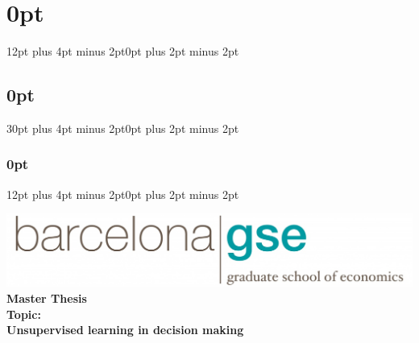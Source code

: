 \documentclass[12pt,a4paper,bibliography=totocnumbered,listof=totocnumbered]{scrartcl}
\begin{document}
\titlespacing\section{0pt}{12pt plus 4pt minus 2pt}{0pt plus 2pt minus 2pt}
\titlespacing\subsection{0pt}{30pt plus 4pt minus 2pt}{0pt plus 2pt minus 2pt}
\titlespacing\subsubsection{0pt}{12pt plus 4pt minus 2pt}{0pt plus 2pt minus 2pt}

\renewcommand{\sectionmark}[1]{\markright{#1}}
\renewcommand{\leftmark}{\rightmark}
\pagestyle{fancy}
\lhead{}
\chead{}
\rhead{\thesection\space\contentsname}
\cfoot{}
\rfoot{\ \linebreak \thepage}
\renewcommand{\headrulewidth}{0.4pt}
\renewcommand{\footrulewidth}{0.4pt}


\renewcommand{\thesection}{\Roman{section}}
\renewcommand{\theHsection}{\Roman{section}}


\thispagestyle{empty}
\begin{center}
	\includegraphics[width=\textwidth]{Pictures/logo01.jpg}\\
	\vspace*{2cm}
	\vspace*{2cm}
	\Huge
	\textbf{Master Thesis}\\
	\vspace*{0.5cm}
	\large
	\textbf{Topic:}\\
	\vspace*{1cm}
	\textbf{Unsupervised learning in decision making}\\
	\vspace*{2cm}
\end{center}	
\end{document}
